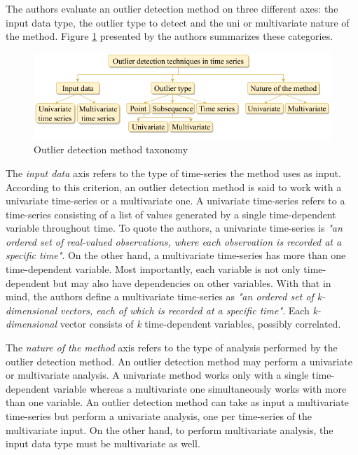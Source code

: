 The authors evaluate an outlier detection method on three different axes: the input data type, the outlier type to detect and the uni or multivariate nature of the method. Figure \ref{fig:outlier-taxonomy} presented by the authors summarizes these categories.

\begin{figure}[!htb]
  \begin{center}
    \includegraphics[scale=0.55]{figures/outlier-method-taxonomy.png}
    \caption{Outlier detection method taxonomy}
    \label{fig:outlier-taxonomy}
  \end{center}
\end{figure}

The \textit{input data} axis refers to the type of time-series the method uses as input. According to this criterion, an outlier detection method is said to work with a univariate time-series or a multivariate one. A univariate time-series refers to a time-series consisting of a list of values generated by a single time-dependent variable throughout time. To quote the authors, a univariate time-series is \textit{"an ordered set of real-valued observations, where each observation is recorded at a specific time"}. On the other hand, a multivariate time-series has more than one time-dependent variable. Most importantly, each variable is not only time-dependent but may also have dependencies on other variables. With that in mind, the authors define a multivariate time-series as \textit{"an ordered set of k-dimensional vectors, each of which is recorded at a specific time"}. Each \textit{k-dimensional} vector consists of \textit{k}  time-dependent variables, possibly correlated.

The \textit{nature of the method} axis refers to the type of analysis performed by the outlier detection method. An outlier detection method may perform a univariate or multivariate analysis. A univariate method works only with a single time-dependent variable whereas a multivariate one simultaneously works with more than one variable. An outlier detection method can take as input a multivariate time-series but perform a univariate analysis, one per time-series of the multivariate input. On the other hand, to perform multivariate analysis, the input data type must be multivariate as well.

